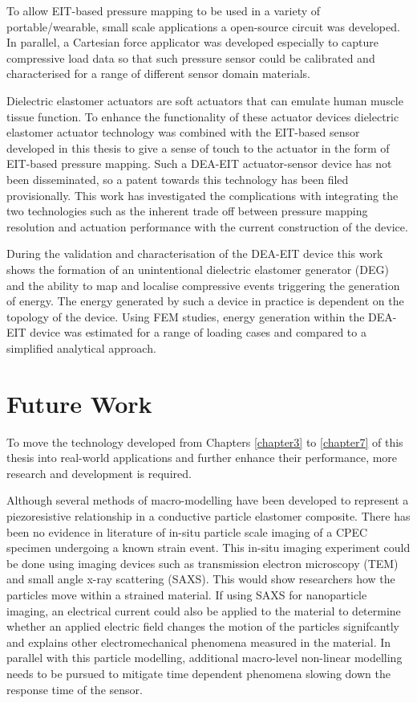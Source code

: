 To allow EIT-based pressure mapping to be used in a variety of portable/wearable, small scale applications a open-source circuit was developed. In parallel, a Cartesian force applicator was developed especially to capture compressive load data so that such pressure sensor could be calibrated and characterised for a range of different sensor domain materials.

Dielectric elastomer actuators are soft actuators that can emulate human muscle tissue function. To enhance the functionality of these actuator devices dielectric elastomer actuator technology was combined with the EIT-based sensor developed in this thesis to give a sense of touch to the actuator in the form of EIT-based pressure mapping. Such a DEA-EIT actuator-sensor device has not been disseminated, so a patent towards this technology has been filed provisionally. This work has investigated the complications with integrating the two technologies such as the inherent trade off between pressure mapping resolution and actuation performance with the current construction of the device.

During the validation and characterisation of the DEA-EIT device this work shows the formation of an unintentional dielectric elastomer generator (DEG) and the ability to map and localise compressive events triggering the generation of energy. The energy generated by such a device in practice is dependent on the topology of the device. Using FEM studies, energy generation within the DEA-EIT device was estimated for a range of loading cases and compared to a simplified analytical approach.



\section{Future Work}
To move the technology developed from Chapters \ref{chapter3} to \ref{chapter7} of this thesis into real-world applications and further enhance their performance, more research and development is required.

Although several methods of macro-modelling have been developed to represent a piezoresistive relationship in a conductive particle elastomer composite. There has been no evidence in literature of in-situ particle scale imaging of a CPEC specimen undergoing a known strain event. This in-situ imaging experiment could be done using imaging devices such as transmission electron microscopy (TEM) and small angle x-ray scattering (SAXS). This would show researchers how the particles move within a strained material. If using SAXS for nanoparticle imaging, an electrical current could also be applied to the material to determine whether an applied electric field changes the motion of the particles signifcantly and explains other electromechanical phenomena measured in the material. In parallel with this particle modelling, additional macro-level non-linear modelling needs to be pursued to mitigate time dependent phenomena slowing down the response time of the sensor.

